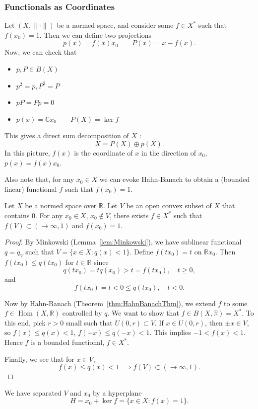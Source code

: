 
\subsubsection{Functionals as Coordinates}

Let $(X, \|\cdot \|)$ be a normed space, and consider some $f \in X^*$ such that $f(x_0) = 1$. Then we can define two projections
\[
	p(x) = f(x) x_0 \qquad P(x) = x - f(x)
.\] 
Now, we can check that
\begin{itemize}
	\item $p, P \in B(X)$
	\item $p^2 = p, P^2 = P$
	\item $p P = P p = 0$ 
	\item $p(x) = \mathbb{C} x_0 \qquad P(X) = \operatorname{ker} f$
\end{itemize}
This gives a direct sum decomposition of $X$ :
\[
	X = P(X) \oplus p(X)
.\] 
In this picture, $f(x)$ is the coordinate of $x$ in the direction of $x_0$, $p\left( x \right)  = f(x) x_0$.

Also note that, for any $x_0 \in X$ we can evoke Hahn-Banach to obtain a (bounded linear) functional $f$ such that $f(x_0)= 1$.

\begin{lemma}
	\label{lem:Separation}

	Let $X$ be a normed space over $\mathbb{R}$. Let $V$ be an open convex subset of $X$ that contains $0$. For any $x_0 \in X$, $x_0 \not\in V$, there exists $f \in X^*$ such that $f(V) \subset (\to \infty , 1)$ and $f(x_0) = 1$.
	
\end{lemma}
\begin{proof}
	By Minkowski (Lemma~\ref{lem:Minkowski}), we have sublinear functional $q = q_V$ such that $V = \{x \in X: q(x) < 1\} $. 
	Define $f(t x_0) = t$ on $\mathbb{R}x_0$. Then $f(t x_0) \le q(t x_0)$ for $t \in \mathbb{R}$ since
	\[
		q(t x_0) = t q(x_0) > t = f(t x_0), \quad t \ge 0
	,\] 
	and
	\[
		f(t x_0) = t < 0 \le q(t x_0), \quad t < 0
	.\] 
	
	Now by Hahn-Banach (Theorem~\ref{thm:HahnBanachThm}), we extend $f$ to some $f \in \operatorname{Hom} (X, \mathbb{R})$ controlled by $q$. We want to show that $f \in B(X, \mathbb{R}) = X^*$. To this end, pick $r>0$ small such that $U(0, r) \subset V$. If $x \in U(0,r)$, then $\pm x \in V$, so $f(x) \le q(x) < 1$, $f(-x) \le q(-x) < 1$. This implies $-1 < f(x) < 1$. Hence $f$ is a bounded functional, $f \in X^*$.

	Finally, we see that for $x \in V$,
	\[
		f(x) \le  q(x) < 1 \implies f(V) \subset (\to \infty , 1)
	.\] 
\end{proof}
\begin{remark}
	We have separated $V$ and $x_0$ by a hyperplane
	\[
		H = x_0 + \operatorname{ker} f = \{x \in X: f(x) = 1\} 
	.\] 
\end{remark}

